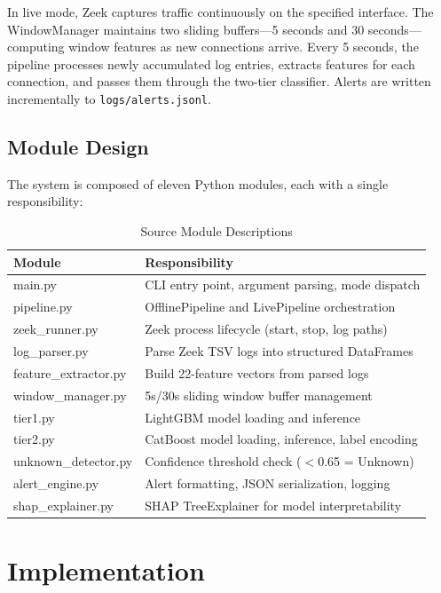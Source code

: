 \documentclass[12pt,a4paper,twoside]{report}
\begin{document}
In live mode, Zeek captures traffic continuously on the specified interface. The WindowManager maintains two sliding buffers—5 seconds and 30 seconds—computing window features as new connections arrive. Every 5 seconds, the pipeline processes newly accumulated log entries, extracts features for each connection, and passes them through the two-tier classifier. Alerts are written incrementally to \texttt{logs/alerts.jsonl}.

\section{Module Design}

The system is composed of eleven Python modules, each with a single responsibility:

\begin{table}[H]
\centering
\caption{Source Module Descriptions}
\begin{tabularx}{\textwidth}{lX}
\toprule
\textbf{Module} & \textbf{Responsibility} \\
\midrule
main.py & CLI entry point, argument parsing, mode dispatch \\
pipeline.py & OfflinePipeline and LivePipeline orchestration \\
zeek\_runner.py & Zeek process lifecycle (start, stop, log paths) \\
log\_parser.py & Parse Zeek TSV logs into structured DataFrames \\
feature\_extractor.py & Build 22-feature vectors from parsed logs \\
window\_manager.py & 5s/30s sliding window buffer management \\
tier1.py & LightGBM model loading and inference \\
tier2.py & CatBoost model loading, inference, label encoding \\
unknown\_detector.py & Confidence threshold check ($<$0.65 = Unknown) \\
alert\_engine.py & Alert formatting, JSON serialization, logging \\
shap\_explainer.py & SHAP TreeExplainer for model interpretability \\
\bottomrule
\end{tabularx}
\end{table}

\chapter{Implementation}
\end{document}
